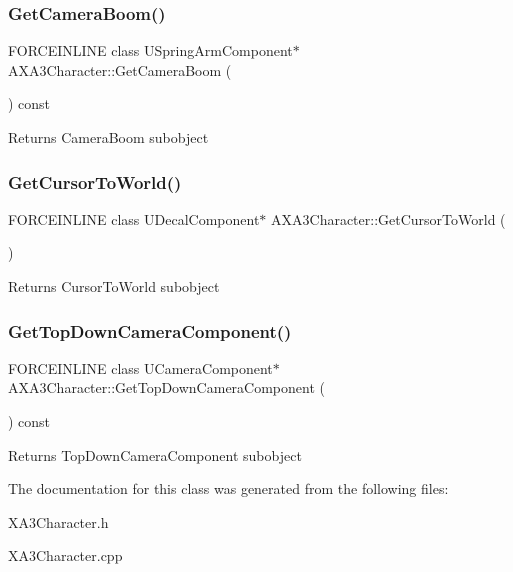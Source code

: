 \subsubsection{\texorpdfstring{Get\+Camera\+Boom()}{GetCameraBoom()}}
{\footnotesize\ttfamily F\+O\+R\+C\+E\+I\+N\+L\+I\+NE class U\+Spring\+Arm\+Component$\ast$ A\+X\+A3\+Character\+::\+Get\+Camera\+Boom (\begin{DoxyParamCaption}{ }\end{DoxyParamCaption}) const\hspace{0.3cm}{\ttfamily [inline]}}

Returns Camera\+Boom subobject \hypertarget{class_a_x_a3_character_aea6ee1ad712275c59026b4c7b7b8edf2}{}\label{class_a_x_a3_character_aea6ee1ad712275c59026b4c7b7b8edf2} 
\subsubsection{\texorpdfstring{Get\+Cursor\+To\+World()}{GetCursorToWorld()}}
{\footnotesize\ttfamily F\+O\+R\+C\+E\+I\+N\+L\+I\+NE class U\+Decal\+Component$\ast$ A\+X\+A3\+Character\+::\+Get\+Cursor\+To\+World (\begin{DoxyParamCaption}{ }\end{DoxyParamCaption})\hspace{0.3cm}{\ttfamily [inline]}}

Returns Cursor\+To\+World subobject \hypertarget{class_a_x_a3_character_a89f06b20e3c4350a374a821345bf424c}{}\label{class_a_x_a3_character_a89f06b20e3c4350a374a821345bf424c} 
\subsubsection{\texorpdfstring{Get\+Top\+Down\+Camera\+Component()}{GetTopDownCameraComponent()}}
{\footnotesize\ttfamily F\+O\+R\+C\+E\+I\+N\+L\+I\+NE class U\+Camera\+Component$\ast$ A\+X\+A3\+Character\+::\+Get\+Top\+Down\+Camera\+Component (\begin{DoxyParamCaption}{ }\end{DoxyParamCaption}) const\hspace{0.3cm}{\ttfamily [inline]}}

Returns Top\+Down\+Camera\+Component subobject 

The documentation for this class was generated from the following files\+:\begin{DoxyCompactItemize}
\item 
X\+A3\+Character.\+h\item 
X\+A3\+Character.\+cpp\end{DoxyCompactItemize}
